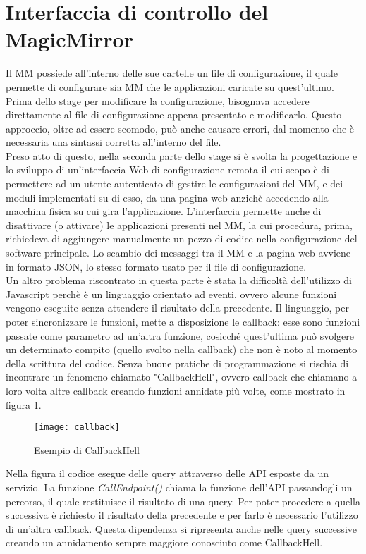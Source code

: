 \section{Interfaccia di controllo del MagicMirror}\label{cap:interfacciaproblemi}
Il MM possiede all'interno delle sue cartelle un file di configurazione, il quale permette
di configurare sia MM che le applicazioni caricate su quest'ultimo.
Prima dello stage per modificare la configurazione, bisognava accedere direttamente al file di configurazione
appena presentato e modificarlo. Questo approccio, oltre ad essere scomodo, pu\`o anche
causare errori, dal momento che \`e necessaria una sintassi corretta all'interno del file.\\[1\baselineskip]
Preso atto di questo, nella seconda parte dello stage si \`e svolta la progettazione e lo sviluppo di un'interfaccia Web di configurazione remota
il cui scopo \`e di permettere ad un utente autenticato di gestire
le configurazioni del MM, e dei moduli implementati su di esso, da una pagina web
anzich\`e accedendo alla macchina fisica su cui gira l'applicazione.
L'interfaccia permette anche di disattivare (o attivare) le applicazioni presenti nel MM,
la cui procedura, prima, richiedeva di aggiungere manualmente un pezzo di codice nella
configurazione del software principale.
Lo scambio dei messaggi tra il MM e la pagina web avviene in formato JSON, lo stesso formato
usato per il file di configurazione.\\
Un altro problema riscontrato in questa parte \`e stata la difficolt\`a dell'utilizzo di Javascript
perch\`e \`e un linguaggio orientato ad eventi, ovvero alcune funzioni vengono eseguite senza attendere
il risultato della precedente. Il linguaggio, per poter sincronizzare le funzioni, mette a disposizione
le callback: esse sono funzioni passate come parametro ad un'altra funzione, cosicch\'e
quest'ultima pu\`o svolgere un determinato compito (quello svolto nella callback) che non \`e noto al momento
della scrittura del codice.
Senza buone pratiche di programmazione si rischia di incontrare un fenomeno chiamato "CallbackHell", ovvero callback che chiamano a loro volta
altre callback creando funzioni annidate pi\`u volte, come mostrato in figura \ref{fig:hell}.
\begin{figure}[H]
    \texttt{[image: callback]}
    \caption{Esempio di CallbackHell}
    \label{fig:hell}
\end{figure}
Nella figura il codice esegue delle query attraverso delle API esposte da un servizio. La funzione \textit{CallEndpoint()} chiama la funzione dell'API passandogli
un percorso, il quale restituisce il risultato di una query. Per poter procedere a quella successiva \`e richiesto il risultato della precedente e
per farlo \`e necessario l'utilizzo di un'altra callback. Questa dipendenza si ripresenta anche nelle query successive creando un annidamento
sempre maggiore conosciuto come CallbackHell.
